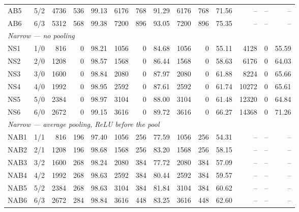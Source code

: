 \begin{table}[t]
\begin{tabular}{llrrrrrrrrrrrr}
AB5 & 5/2 & 4736 & 536 & 99.13 & 6176 & 768 & 91.29 & 6176 & 768 & 71.56 & -- & -- & -- \\
AB6 & 6/3 & 5312 & 568 & 99.38 & 7200 & 896 & 93.05 & 7200 & 896 & 75.35 & -- & -- & -- \\
\midrule
\multicolumn{14}{l}{\textit{Narrow --- no pooling}} \\
NS1 & 1/0 & 816 & 0 & 98.21 & 1056 & 0 & 84.68 & 1056 & 0 & 55.11 & 4128 & 0 & 55.59 \\
NS2 & 2/0 & 1208 & 0 & 98.57 & 1568 & 0 & 86.44 & 1568 & 0 & 58.63 & 6176 & 0 & 64.03 \\
NS3 & 3/0 & 1600 & 0 & 98.84 & 2080 & 0 & 87.97 & 2080 & 0 & 61.88 & 8224 & 0 & 65.66 \\
NS4 & 4/0 & 1992 & 0 & 98.95 & 2592 & 0 & 87.61 & 2592 & 0 & 61.74 & 10272 & 0 & 65.61 \\
NS5 & 5/0 & 2384 & 0 & 98.97 & 3104 & 0 & 88.00 & 3104 & 0 & 61.48 & 12320 & 0 & 64.84 \\
NS6 & 6/0 & 2672 & 0 & 99.15 & 3616 & 0 & 89.72 & 3616 & 0 & 66.27 & 14368 & 0 & 71.26 \\
\midrule
\multicolumn{14}{l}{\textit{Narrow --- average pooling, ReLU before the pool}} \\
NAB1 & 1/1 & 816 & 196 & 97.40 & 1056 & 256 & 77.59 & 1056 & 256 & 54.31 & -- & -- & -- \\
NAB2 & 2/1 & 1208 & 196 & 98.68 & 1568 & 256 & 83.20 & 1568 & 256 & 58.15 & -- & -- & -- \\
NAB3 & 3/2 & 1600 & 268 & 98.24 & 2080 & 384 & 77.72 & 2080 & 384 & 57.09 & -- & -- & -- \\
NAB4 & 4/2 & 1992 & 268 & 98.63 & 2592 & 384 & 80.44 & 2592 & 384 & 59.57 & -- & -- & -- \\
NAB5 & 5/2 & 2384 & 268 & 98.63 & 3104 & 384 & 81.84 & 3104 & 384 & 60.62 & -- & -- & -- \\
NAB6 & 6/3 & 2672 & 284 & 98.84 & 3616 & 448 & 83.25 & 3616 & 448 & 62.60 & -- & -- & -- \\
\bottomrule
\end{tabular}
\end{table}
